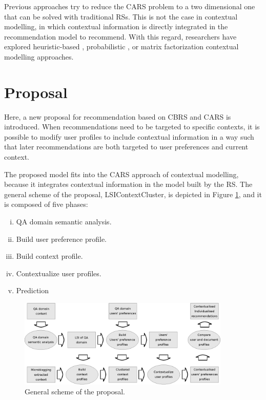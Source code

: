 \documentclass[preprint]{elsarticle}
\begin{document}
\begin{spacing}{1.5}
Previous approaches try to reduce the CARS problem to a two dimensional one that can be solved with traditional RSs. This is not the case in contextual modelling, in which contextual information is directly integrated in the recommendation model to recommend. With this regard, researchers have explored heuristic-based \cite{Panniello2014}, probabilistic \cite{Adomavicius2005b}, or matrix factorization \cite{Baltrunas2011c} contextual modelling approaches.

\section{Proposal}
\label{sec:proposal}

Here, a new proposal for recommendation based on CBRS and CARS is introduced. When recommendations need to be targeted to specific contexts, it is possible to modify user profiles to include contextual information in a way such that later recommendations are both targeted to user preferences and current context.

The proposed model fits into the CARS approach of contextual modelling, because it integrates contextual information in the model built by the RS. The general scheme of the proposal, LSIContextCluster, is depicted in Figure \ref{fig:proposal-scheme}, and it is composed of five phases:
\begin{enumerate}[(i)]
	\item QA domain semantic analysis.
	\item Build user preference profile.
	\item Build context profile.
	\item Contextualize user profiles.
	\item Prediction
\end{enumerate}

\begin{figure}[h]
	\centering
	\includegraphics[width=0.9\textwidth]{figures/proposal-scheme.eps}
	\caption{General scheme of the proposal.}
	\label{fig:proposal-scheme}
\end{figure}


\end{spacing}
\end{document}
